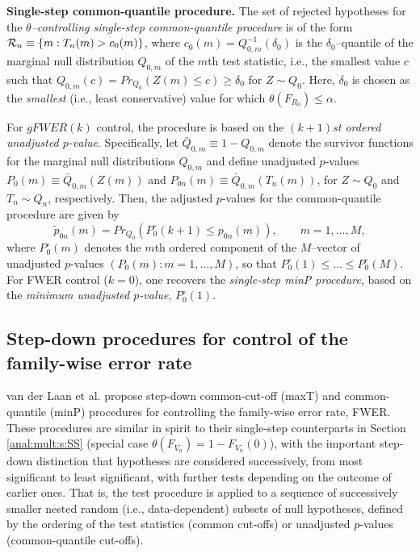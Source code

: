 \documentclass[11pt]{article}
\begin{document}
\noindent
{\bf Single-step common-quantile procedure.} The set of rejected hypotheses for the {\em $\theta$--controlling single-step common-quantile procedure} is of the form
${\cal R}_n \equiv \{m: T_n(m)> c_0(m) \}$, where $c_0(m) = Q_{0,m}^{-1}(\delta_0)$ is the $\delta_0$--quantile of the marginal null distribution $Q_{0,m}$ of the $m$th test statistic, i.e., the smallest value $c$ such that $Q_{0,m}(c) = Pr_{Q_0}(Z(m) \leq c) \geq \delta_0$ for $Z \sim Q_0$. Here, $\delta_0$ is chosen as the {\em smallest} (i.e., least conservative) value for which $\theta(F_{R_0}) \leq \alpha$.

For $gFWER(k)$ control, the procedure is based on the {\em $(k+1)$st ordered unadjusted $p$-value}. 
Specifically, let $\bar{Q}_{0,m} \equiv 1 - Q_{0,m}$ denote the survivor functions for the marginal null distributions $Q_{0,m}$ and define unadjusted $p$-values $P_0(m) \equiv  \bar{Q}_{0,m}(Z(m))$ and $P_{0n}(m) \equiv  \bar{Q}_{0,m}(T_n(m))$, for $Z \sim Q_0$ and  $T_n \sim Q_n$, respectively. Then, the adjusted $p$-values for the common-quantile procedure are given by
\begin{equation}\label{anal:mult:e:SSquant}
\widetilde{p}_{0n}(m) = Pr_{Q_0} \left(P_0^{\circ}(k+1) \leq p_{0n}(m) \right),  \qquad m=1,\ldots, M,
\end{equation}
where $P_0^{\circ}(m)$ denotes the $m$th ordered component of the $M$--vector of unadjusted $p$-values $(P_0(m): m=1,\ldots,M)$, so that $P_0^{\circ}(1) \leq \ldots \leq P_0^{\circ}(M)$.  
For FWER control ($k=0$), one recovers the {\em single-step minP procedure}, based on the {\em minimum unadjusted $p$-value}, $P_0^{\circ}(1)$.



\subsection{Step-down procedures for control of the family-wise error rate}
\label{anal:mult:s:SD}

van der Laan et al. \cite{vdLaanetalMT2SAGMB04} propose step-down common-cut-off (maxT) and common-quantile (minP) procedures for controlling the family-wise error rate, FWER. 
These procedures are similar in spirit to their single-step counterparts in Section \ref{anal:mult:s:SS} (special case $\theta(F_{V_n}) = 1 - F_{V_n}(0)$), with the important step-down distinction that hypotheses are considered successively, from most significant to least significant, with further tests depending on the outcome of earlier ones. 
That is, the test procedure is applied to a sequence of successively smaller nested random (i.e., data-dependent) subsets of null hypotheses, defined by the ordering of the test statistics (common cut-offs) or unadjusted $p$-values (common-quantile cut-offs). \\
\end{document}
